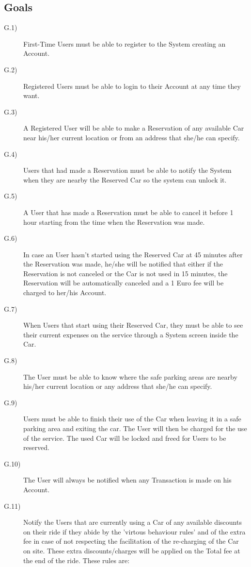 \documentclass[a4paper]{article}
\begin{document}
\subsection{Goals}
\begin{description}
\item [G.1)]First-Time Users must be able to register to the System creating an Account. 
\item [G.2)]Registered Users must be able to login to their Account at any time they want.
\item [G.3)]A Registered User will be able to make a Reservation of any available Car near his/her current location or from an address that she/he can specify.
\item [G.4)]Users that had made a Reservation must be able to notify the System when they are nearby the Reserved Car so the system can unlock it.
\item [G.5)]A User that has made a Reservation must be able to cancel it before 1 hour starting from the time when the Reservation was made.
\item [G.6)]In case an User hasn't started using the Reserved Car at 45 minutes after the Reservation was made, he/she will be notified that either if the Reservation is not canceled or the Car is not used in 15 minutes, the Reservation will be automatically canceled and a 1 Euro fee will be charged to her/his Account.
\item [G.7)]When Users that start using their Reserved Car, they must be able to see their current expenses on the service through a System screen inside the Car.
\item [G.8)]The User must be able to know where the safe parking areas are nearby his/her current location or any address that she/he can specify.
\item [G.9)]Users must be able to finish their use of the Car when leaving it in a safe parking area and exiting the car. The User will then be charged for the use of the service. The used Car will be locked and freed for Users to be reserved.
\item [G.10)]The User will always be notified when any Transaction is made on his Account.
\item [G.11)]Notify the Users that are currently using a Car of any available discounts on their ride if they abide by the 'virtous behaviour rules' and of the extra fee in case of not respecting the facilitation of the re-charging of the Car on site. These extra discounts/charges will be applied on the Total fee at the end of the ride. These rules are:

\end{description}
\end{document}
